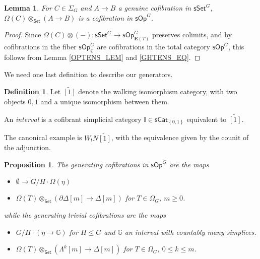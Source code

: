 \documentclass[a4paper,10pt
,draft
]{article}%
\numberwithin{equation}{section}
\numberwithin{figure}{section}
\newtheorem{lemma}[equation]{Lemma}%
\newtheorem{proposition}[equation]{Proposition}%
\theoremstyle{definition} %
\newtheorem{definition}[equation]{Definition}%
\newcommand{\set}[1]{\left\{#1\right\}}%
\newcommand{\Set}{\ensuremath{\mathsf{Set}}}
\newcommand{\sSet}{\ensuremath{\mathsf{sSet}}}%
\newcommand{\sOp}{\ensuremath{\mathsf{sOp}}}%
\newcommand{\F}{\ensuremath{\mathcal F}}
\newcommand{\1}{\ensuremath{\mathbbm 1}}%
\begin{document}
\begin{lemma}
      \label{OPTENSCOF_LEM}
      For $C \in \Sigma_G$ and $A \to B$ a genuine cofibration in $\sSet^G$,
      $\Omega(C) \otimes_\Set (A \to B)$ is a cofibration in $\sOp^G$.
\end{lemma}
\begin{proof}
      Since $\Omega(C) \otimes (-) \colon \sSet^G \to \sOp^G_{\boldsymbol{E}(T)}$ preserves colimits,
      and by \cite[Prop. 4.11]{BP_HGOP} cofibrations in the fiber $\sOp^G_{\mathfrak C}$ are cofibrations in the total category $\sOp^G$, %
      this follows from Lemma \ref{OPTENS_LEM} and \eqref{GHTENS_EQ}.
\end{proof}














We need one last definition to describe our generators.
\begin{definition}
      Let $\widetilde{[1]}$ denote the walking isomorphism category,
      with two objects $0,1$ and a unique isomorphism between them.
      
      An \textit{interval} is a cofibrant simplicial category $\mathbb I \in \mathsf{sCat}_{\set{0,1}}$ equivalent to $\widetilde{[1]}$.
\end{definition}
The canonical example is $W_!N\widetilde{[1]}$, with the equivalence given by the counit of the adjunction.

\begin{proposition}
      The generating cofibrations in $\mathsf{sOp}^G$
      are the maps
      \begin{itemize}
      \item[(C1)] $\emptyset \to G/H \cdot \Omega(\eta)$ %
      \item[(C2)] $\Omega(T) \otimes_{\Set} (\partial \Delta[m] \to \Delta[m])$
            for $T \in \Omega_G$, $m \geq 0$.
      \end{itemize}
      while the generating trivial cofibrations are the maps 
      \begin{itemize}
      \item[(A1)] 
            $G/H \cdot \left(\eta \to \mathbb{G}\right)$ %
            for $H \leq G$ and $\mathbb G$ an interval with countably many simplices.
      \item[(A2)] 
            $\Omega(T) \otimes_{\Set} (\Lambda^k[m] \to \Delta[m])$
            for $T \in \Omega_G$, $0 \leq k \leq m$.
      \end{itemize}
\end{proposition}
\end{document}

